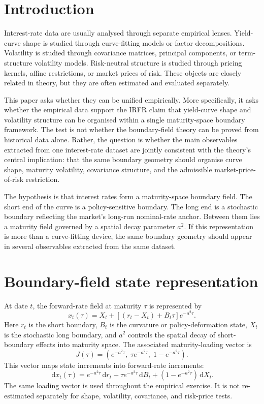 \documentclass[11pt]{article}
\numberwithin{equation}{section}
\newcommand{\dd}{\,\mathrm{d}}
\begin{document}
\section{Introduction}
Interest-rate data are usually analysed through separate empirical lenses. Yield-curve shape is studied through curve-fitting models or factor decompositions. Volatility is studied through covariance matrices, principal components, or term-structure volatility models. Risk-neutral structure is studied through pricing kernels, affine restrictions, or market prices of risk. These objects are closely related in theory, but they are often estimated and evaluated separately.

This paper asks whether they can be unified empirically. More specifically, it asks whether the empirical data support the IRFR claim that yield-curve shape and volatility structure can be organised within a single maturity-space boundary framework. The test is not whether the boundary-field theory can be proved from historical data alone. Rather, the question is whether the main observables extracted from one interest-rate dataset are jointly consistent with the theory's central implication: that the same boundary geometry should organise curve shape, maturity volatility, covariance structure, and the admissible market-price-of-risk restriction.

The hypothesis is that interest rates form a maturity-space boundary field. The short end of the curve is a policy-sensitive boundary. The long end is a stochastic boundary reflecting the market's long-run nominal-rate anchor. Between them lies a maturity field governed by a spatial decay parameter $a^2$. If this representation is more than a curve-fitting device, the same boundary geometry should appear in several observables extracted from the same dataset.

\section{Boundary-field state representation}
At date $t$, the forward-rate field at maturity $\tau$ is represented by
\begin{equation}
 x_t(\tau)=X_t+\left[(r_t-X_t)+B_t\tau\right]e^{-a^2\tau}.
 \label{eq:state}
\end{equation}
Here $r_t$ is the short boundary, $B_t$ is the curvature or policy-deformation state, $X_t$ is the stochastic long boundary, and $a^2$ controls the spatial decay of short-boundary effects into maturity space. The associated maturity-loading vector is
\begin{equation}
 J(\tau)=\left(e^{-a^2\tau},\;\tau e^{-a^2\tau},\;1-e^{-a^2\tau}\right).
 \label{eq:J}
\end{equation}
This vector maps state increments into forward-rate increments:
\begin{equation}
 \dd x_t(\tau)=e^{-a^2\tau}\dd r_t+\tau e^{-a^2\tau}\dd B_t+(1-e^{-a^2\tau})\dd X_t.
 \label{eq:dx}
\end{equation}
The same loading vector is used throughout the empirical exercise. It is not re-estimated separately for shape, volatility, covariance, and risk-price tests.
\end{document}
